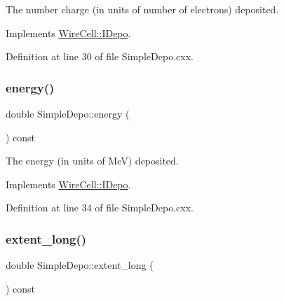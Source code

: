 The number charge (in units of number of electrons) deposited. 



Implements \hyperlink{class_wire_cell_1_1_i_depo_a096a0b84b90685700f26950b0523c43c}{Wire\+Cell\+::\+I\+Depo}.



Definition at line 30 of file Simple\+Depo.\+cxx.

\mbox{\label{class_wire_cell_1_1_simple_depo_acea11f65dc7accc767a196963d93cd02}} 
\subsubsection{\texorpdfstring{energy()}{energy()}}
{\footnotesize\ttfamily double Simple\+Depo\+::energy (\begin{DoxyParamCaption}{ }\end{DoxyParamCaption}) const\hspace{0.3cm}{\ttfamily [virtual]}}



The energy (in units of MeV) deposited. 



Implements \hyperlink{class_wire_cell_1_1_i_depo_a5dad2495f4b329fede8397203824f311}{Wire\+Cell\+::\+I\+Depo}.



Definition at line 34 of file Simple\+Depo.\+cxx.

\mbox{\label{class_wire_cell_1_1_simple_depo_aebb13d9a9c5a5bc0f821d2e690c88c46}} 
\subsubsection{\texorpdfstring{extent\+\_\+long()}{extent\_long()}}
{\footnotesize\ttfamily double Simple\+Depo\+::extent\+\_\+long (\begin{DoxyParamCaption}{ }\end{DoxyParamCaption}) const\hspace{0.3cm}{\ttfamily [virtual]}}

